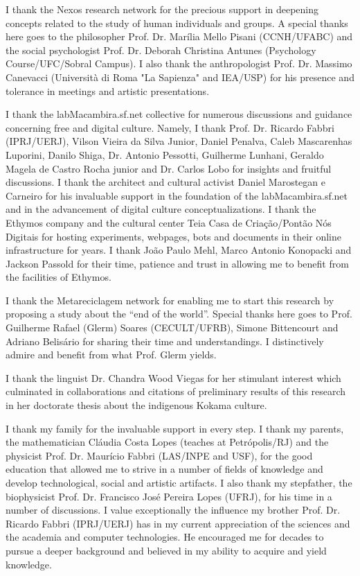 \documentclass[
12pt,		%
openright,	%
twoside,  %
a4paper,			%
chapter=TITLE,		%
english,			%
french,				%
spanish,			%
brazil				%
]{USPSC}
\begin{document}
\begin{agradecimentos}
I thank the Nexos research network for the precious support in deepening concepts related
to the study of human individuals and groups.
A special thanks here goes to the philosopher Prof. Dr. Marília Mello Pisani (CCNH/UFABC) and the social psychologist 
	Prof. Dr. Deborah Christina Antunes (Psychology Course/UFC/Sobral Campus).
I also thank the anthropologist Prof. Dr. Massimo Canevacci (Università di Roma "La Sapienza" and IEA/USP)
for his presence and tolerance in meetings and artistic presentations.

I thank the labMacambira.sf.net collective for numerous discussions and guidance
concerning free and digital culture.
Namely, I thank Prof. Dr. Ricardo Fabbri (IPRJ/UERJ), Vilson Vieira da Silva Junior, Daniel Penalva, Caleb Mascarenhas Luporini, Danilo Shiga,
Dr. Antonio Pessotti, Guilherme Lunhani, Geraldo Magela de Castro Rocha junior and Dr. Carlos Lobo for insights and fruitful discussions.
I thank the architect and cultural activist Daniel Marostegan e Carneiro for his invaluable support in
the foundation of the labMacambira.sf.net and in the advancement of digital culture conceptualizations.
I thank the Ethymos company and the cultural center Teia Casa de Criação/Pontão Nós Digitais for hosting experiments, webpages, bots and documents in their online infrastructure for years.
I thank João Paulo Mehl, Marco Antonio Konopacki and Jackson Passold for their time, patience and trust in allowing me to benefit from the facilities of Ethymos.

I thank the Metareciclagem network for enabling me to start this research by proposing
a study about the ``end of the world''.
	Special thanks here goes to Prof. Guilherme Rafael (Glerm) Soares (CECULT/UFRB), Simone Bittencourt and Adriano Belisário
for sharing their time and understandings.
I distinctively admire and benefit from what Prof. Glerm yields.

I thank the linguist Dr. Chandra Wood Viegas for her stimulant interest
which culminated in collaborations and citations of preliminary results of this research in her doctorate thesis
	about the indigenous Kokama culture.

I thank my family for the invaluable support in every step.
I thank my parents, the mathematician Cláudia Costa Lopes (teaches at Petrópolis/RJ) and the
	physicist Prof. Dr. Maurício Fabbri (LAS/INPE and USF), for the good education that
allowed me to strive in a number of fields of knowledge 
and develop technological, social and artistic artifacts.
I also thank my stepfather, the biophysicist Prof. Dr. Francisco José Pereira Lopes (UFRJ),
for his time in a number of discussions.
I value exceptionally the influence my brother Prof. Dr. Ricardo Fabbri (IPRJ/UERJ)
has in my current appreciation
of the sciences and the academia and computer technologies.
He encouraged me for decades to pursue a deeper background and believed in my ability to acquire and yield knowledge.


\end{agradecimentos}
\end{document}
